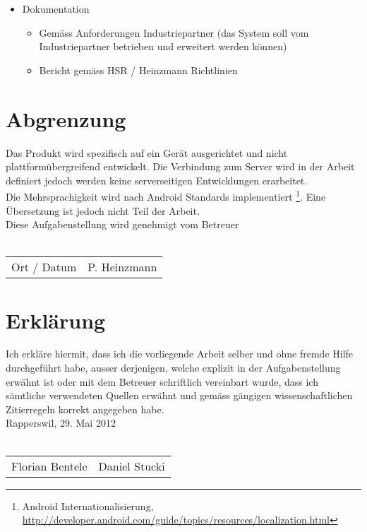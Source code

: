 \begin{itemize}
\item Dokumentation
\begin{itemize}
\item Gemäss Anforderungen Industriepartner (das System soll vom Industriepartner betrieben und erweitert werden können)
\item Bericht gemäss HSR / Heinzmann Richtlinien
\end{itemize}
\end{itemize}

\section*{Abgrenzung}
Das Produkt wird spezifisch auf ein Gerät ausgerichtet und nicht plattformübergreifend entwickelt. Die Verbindung zum Server wird in der Arbeit definiert jedoch werden keine serverseitigen Entwicklungen erarbeitet.
\\
Die Mehrsprachigkeit wird nach Android Standards implementiert \footnote{Android Internationalisierung, \url{http://developer.android.com/guide/topics/resources/localization.html}}. Eine Übersetzung ist jedoch nicht Teil der Arbeit.
\\
Diese Aufgabenstellung wird genehmigt vom Betreuer
\\
\\

\begin{tabular}{p{3cm}p{4cm}}
\hline
Ort / Datum & P. Heinzmann
\end{tabular}

\section*{Erklärung}
Ich erkläre hiermit, dass ich die vorliegende Arbeit selber und ohne fremde Hilfe durchgeführt habe, ausser derjenigen, welche explizit in der Aufgabenstellung erwähnt ist oder mit dem Betreuer schriftlich vereinbart wurde, dass ich sämtliche verwendeten Quellen erwähnt und gemäss gängigen wissenschaftlichen Zitierregeln korrekt angegeben habe.
\\
Rapperswil, 29. Mai 2012
\\
\\

\begin{tabular}{p{5cm}p{5cm}}
\hline

Florian Bentele & Daniel Stucki
\end{tabular}
